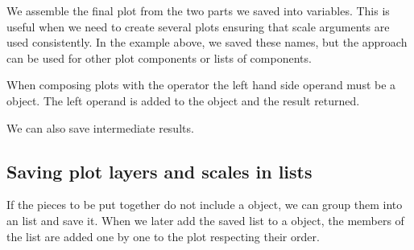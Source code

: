\documentclass[krantz2]{krantz}\usepackage{knitr}%
\begin{document}
We assemble the final plot from the two parts we saved into variables. This is useful when we need to create several plots ensuring that scale  arguments are used consistently. In the example above, we saved these names, but the approach can be used for other plot components or lists of components.

\begin{warningbox}
 When composing plots with the \code{+} operator the left hand side operand must be a  object. The left operand is added to the  object and the result returned.
\end{warningbox}

\begin{knitrout}\footnotesize
{}\color{fgcolor}\begin{kframe}
\begin{alltt}
 \hlopt{+}  \hlopt{+} \hlstd{(}\hlstd{)}
 \hlopt{+}  \hlopt{+} \hlstd{(}\hlstd{)} \hlopt{+} \hlstd{(}\hlstd{,} \hlstd{)}
\end{alltt}
\end{kframe}
\end{knitrout}

We can also save intermediate results.

\begin{knitrout}\footnotesize
{}\color{fgcolor}\begin{kframe}
\begin{alltt}
 \hlkwb{<-}  \hlopt{+} \hlstd{(}\hlstd{=}\hlstd{(}\hlstd{,}\hlstd{))}
 \hlopt{+}  \hlopt{+} \hlstd{(}\hlstd{)}
\end{alltt}
\end{kframe}
\end{knitrout}

\subsection{Saving plot layers and scales in lists}

If the pieces to be put together do not include a  object, we can group them into an \Rlang list and save it. When we later add the saved list to a  object, the members of the list are added one by one to the plot respecting their order.
\end{document}

